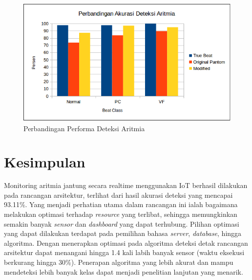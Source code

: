 \documentclass[]{indojc_single}
\begin{document}
\begin{figure}[H]
\centerline{\includegraphics[scale=0.41]{images/aritmia_acc.png}}
\caption{Perbandingan Performa Deteksi Aritmia}
\label{fig:aritmia_acc}
\end{figure}

\section{Kesimpulan}
Monitoring aritmia jantung secara realtime menggunakan IoT berhasil dilakukan pada rancangan arsitektur, terlihat dari hasil akurasi deteksi yang mencapai 93.11\%. Yang menjadi perhatian utama dalam rancangan ini ialah bagaimana melakukan optimasi terhadap \textit{resource} yang terlibat, sehingga memungkinkan semakin banyak \textit{sensor} dan \textit{dashboard} yang dapat terhubung. Pilihan optimasi yang dapat dilakukan terdapat pada pemilihan bahasa \textit{server}, \textit{database}, hingga algoritma. Dengan menerapkan optimasi pada algoritma deteksi detak rancangan arsitektur dapat menangani hingga 1.4 kali labih banyak sensor (waktu eksekusi berkurang hingga 30\%). Penerapan algoritma yang lebih akurat dan mampu mendeteksi lebih banyak kelas dapat menjadi penelitian lanjutan yang menarik.



{}
\end{document}
